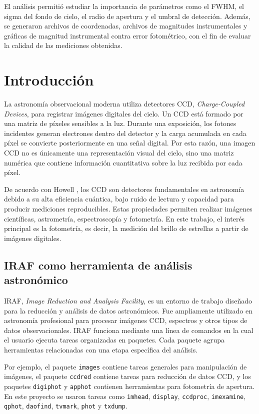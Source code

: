 \documentclass[12pt,letterpaper]{article}
\begin{document}
El análisis permitió estudiar la importancia de parámetros como el FWHM, el sigma del fondo de cielo, el radio de apertura y el umbral de detección. Además, se generaron archivos de coordenadas, archivos de magnitudes instrumentales y gráficas de magnitud instrumental contra error fotométrico, con el fin de evaluar la calidad de las mediciones obtenidas.

\section{Introducción}

La astronomía observacional moderna utiliza detectores CCD, \textit{Charge-Coupled Devices}, para registrar imágenes digitales del cielo. Un CCD está formado por una matriz de píxeles sensibles a la luz. Durante una exposición, los fotones incidentes generan electrones dentro del detector y la carga acumulada en cada píxel se convierte posteriormente en una señal digital. Por esta razón, una imagen CCD no es únicamente una representación visual del cielo, sino una matriz numérica que contiene información cuantitativa sobre la luz recibida por cada píxel.

De acuerdo con Howell \cite{howell2006}, los CCD son detectores fundamentales en astronomía debido a su alta eficiencia cuántica, bajo ruido de lectura y capacidad para producir mediciones reproducibles. Estas propiedades permiten realizar imágenes científicas, astrometría, espectroscopía y fotometría. En este trabajo, el interés principal es la fotometría, es decir, la medición del brillo de estrellas a partir de imágenes digitales.

\subsection{IRAF como herramienta de análisis astronómico}

IRAF, \textit{Image Reduction and Analysis Facility}, es un entorno de trabajo diseñado para la reducción y análisis de datos astronómicos. Fue ampliamente utilizado en astronomía profesional para procesar imágenes CCD, espectros y otros tipos de datos observacionales. IRAF funciona mediante una línea de comandos en la cual el usuario ejecuta tareas organizadas en paquetes. Cada paquete agrupa herramientas relacionadas con una etapa específica del análisis.

Por ejemplo, el paquete \texttt{images} contiene tareas generales para manipulación de imágenes, el paquete \texttt{ccdred} contiene tareas para reducción de datos CCD, y los paquetes \texttt{digiphot} y \texttt{apphot} contienen herramientas para fotometría de apertura. En este proyecto se usaron tareas como \texttt{imhead}, \texttt{display}, \texttt{ccdproc}, \texttt{imexamine}, \texttt{qphot}, \texttt{daofind}, \texttt{tvmark}, \texttt{phot} y \texttt{txdump}.
\end{document}
